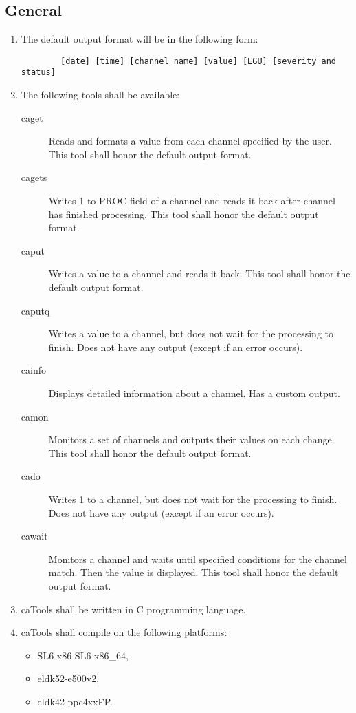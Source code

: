 \documentclass[12pt,a4paper]{article}
\begin{document}
\subsection{General}
\begin{enumerate}
	\item The default output format will be in the following form: 
	\begin{verbatim}
		[date] [time] [channel name] [value] [EGU] [severity and status]
	\end{verbatim}
	\item The following tools shall be available:
	\begin{description}
		\item [caget] Reads and formats a value from each channel specified by the user. This tool shall honor the default output format.
		\item [cagets] Writes 1 to PROC field of a channel and reads it back after channel has finished processing. This tool shall honor the default output format.
		\item [caput] Writes a value to a channel and reads it back. This tool shall honor the default output format.
		\item [caputq] Writes a value to a channel, but does not wait for the processing to finish. Does not have any output (except if an error occurs).
		\item [cainfo] Displays detailed information about a channel. Has a custom output.
		\item [camon] Monitors a set of channels and outputs their values on each change. This tool shall honor the default output format.
		\item [cado] Writes 1 to a channel, but does not wait for the processing to finish. Does not have any output (except if an error occurs).
		\item [cawait] Monitors a channel and waits until specified conditions for the channel match. Then the value is displayed. This tool shall honor the default output format.
	\end{description}
	\item caTools shall be written in C programming language.
	\item caTools shall compile on the following platforms:
	\begin{itemize}
		\item SL6-x86 SL6-x86\_64,
		\item eldk52-e500v2,
		\item eldk42-ppc4xxFP.
	\end{itemize}

\end{enumerate}
\end{document}
